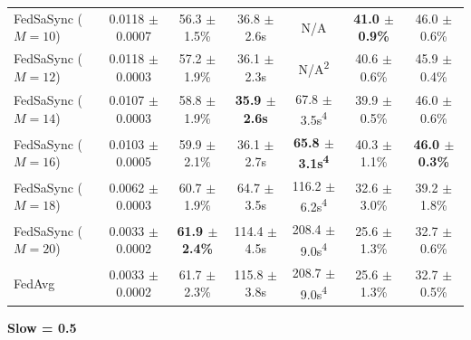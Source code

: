 \begin{table}[t]
{\begin{tabular}{lcccccc}
FedSaSync ($M = 10$) & 0.0118 $\pm$ 0.0007 & 56.3 $\pm$ 1.5\% & 36.8 $\pm$ 2.6s & N/A & \textbf{41.0 $\pm$ 0.9\%} & 46.0 $\pm$ 0.6\% \\
FedSaSync ($M = 12$) & 0.0118 $\pm$ 0.0003 & 57.2 $\pm$ 1.9\% & 36.1 $\pm$ 2.3s & N/A\textsuperscript{2} & 40.6 $\pm$ 0.6\% & 45.9 $\pm$ 0.4\% \\
FedSaSync ($M = 14$) & 0.0107 $\pm$ 0.0003 & 58.8 $\pm$ 1.9\% & \textbf{35.9 $\pm$ 2.6s} & 67.8 $\pm$ 3.5s\textsuperscript{4} & 39.9 $\pm$ 0.5\% & 46.0 $\pm$ 0.6\% \\
FedSaSync ($M = 16$) & 0.0103 $\pm$ 0.0005 & 59.9 $\pm$ 2.1\% & 36.1 $\pm$ 2.7s & \textbf{65.8 $\pm$ 3.1s\textsuperscript{4}} & 40.3 $\pm$ 1.1\% & \textbf{46.0 $\pm$ 0.3\%} \\
FedSaSync ($M = 18$) & 0.0062 $\pm$ 0.0003 & 60.7 $\pm$ 1.9\% & 64.7 $\pm$ 3.5s & 116.2 $\pm$ 6.2s\textsuperscript{4} & 32.6 $\pm$ 3.0\% & 39.2 $\pm$ 1.8\% \\
FedSaSync ($M = 20$) & 0.0033 $\pm$ 0.0002 & \textbf{61.9 $\pm$ 2.4\%} & 114.4 $\pm$ 4.5s & 208.4 $\pm$ 9.0s\textsuperscript{4} & 25.6 $\pm$ 1.3\% & 32.7 $\pm$ 0.6\% \\
FedAvg & 0.0033 $\pm$ 0.0002 & 61.7 $\pm$ 2.3\% & 115.8 $\pm$ 3.8s & 208.7 $\pm$ 9.0s\textsuperscript{4} & 25.6 $\pm$ 1.3\% & 32.7 $\pm$ 0.5\% \\
\hline
\end{tabular}%
}
\par\vspace{0.8em}
\noindent\textbf{Slow = 0.5} \\[0.2em]
\end{table}
